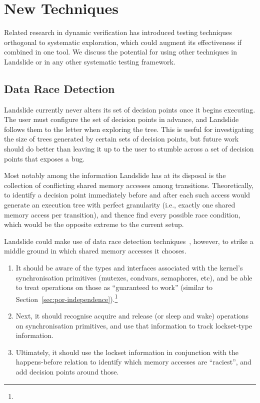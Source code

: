 \section{New Techniques}
\label{sec:future-new}

Related research in dynamic verification has introduced testing techniques orthogonal to systematic exploration, which could augment its effectiveness if combined in one tool. We discuss the potential for using other techniques in Landslide or in any other systematic testing framework.

\subsection{Data Race Detection}
\label{sec:future-analysis}

Landslide currently never alters its set of decision points once it begins executing. The user must configure the set of decision points in advance, and Landslide follows them to the letter when exploring the tree. This is useful for investigating the size of trees generated by certain sets of decision points, but future work should do better than leaving it up to the user to stumble across a set of decision points that exposes a bug.

Most notably among the information Landslide has at its disposal is the collection of conflicting shared memory accesses among transitions. Theoretically, to identify a decision point immediately before and after each such access would generate an execution tree with perfect granularity (i.e., exactly one shared memory access per transition), and thence find every possible race condition, which would be the opposite extreme to the current setup.

Landslide could make use of data race detection techniques~\cite{datacollider}, however, to strike a middle ground in which shared memory accesses it chooses.
\begin{enumerate}
	\item It should be aware of the types and interfaces associated with the kernel's synchronisation primitives (mutexes, condvars, semaphores, etc), and be able to treat operations on those as ``guaranteed to work'' (similar to Section~\ref{sec:por-independence}).\footnote{
	}
	\item Next, it should recognise acquire and release (or sleep and wake) operations on synchronisation primitives, and use that information to track lockset-type information.
	\item Ultimately, it should use the lockset information in conjunction with the happens-before relation to identify which memory accesses are ``raciest'', and add decision points around those.
\end{enumerate}

